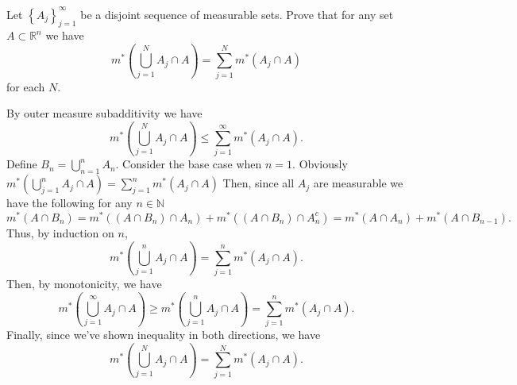 \begin{problem}{6}
  Let $\left\{ A_{j} \right\}_{j=1}^{\infty}$ be a disjoint sequence of measurable sets.
  Prove that for any set $A \subset \mathbb{R}^{n}$ we have 
  \[
  m^{*}\left( \bigcup_{j=1}^{N} A_{j} \cap A  \right) = \sum_{j=1}^{N} m^{*}\left( A_{j} \cap A \right)
  \] 
  for each $N$.
\end{problem}

\begin{solution}
  By outer measure subadditivity we have 
  \[
  m^{*}\left( \bigcup_{j=1}^{N}  A_{j} \cap A \right) \leq \sum_{j=1}^{\infty} m^{*}\left( A_{j} \cap A \right)
  .\] 
  Define $B_{n} = \bigcup_{n=1}^{n}A_{n} $.
  Consider the base case when $n = 1$.
  Obviously $m^{*}\left( \bigcup_{j=1}^{n} A_{j} \cap A  \right) = \sum_{j=1}^{n} m^{*}\left( A_{j} \cap A \right)$
  Then, since all $A_{j}$ are measurable we have the following for any $n \in \mathbb{N}$
  \[
  m^{*}(A \cap B_{n}) = m^{*}\left( \left( A \cap B_{n} \right) \cap A_{n} \right) + m^{*}\left( \left( A \cap B_{n} \right) \cap A_{n}^{c} \right) = m^{*}\left( A \cap A_{n} \right) + m^{*}\left( A \cap B_{n-1} \right)
  .\] 
  Thus, by induction on $n$, 
  \[
    m^{*}\left( \bigcup_{j=1}^{n}  A_{j} \cap A \right) = \sum_{j=1}^{n} m^{*}\left( A_{j} \cap A \right)
  .\] 
  Then, by monotonicity, we have 
  \[
  m^{*}\left( \bigcup_{j=1}^{\infty} A_{j} \cap A  \right) \geq m^{*}\left( \bigcup_{j=1}^{n} A_{j} \cap A  \right) = \sum_{j=1}^{n} m^{*}\left( A_{j} \cap A \right)
  .\] 
  Finally, since we've shown inequality in both directions, we have
  \[
    m^{*}\left( \bigcup_{j=1}^{N} A_{j} \cap A  \right) = \sum_{j=1}^{N} m^{*}\left( A_{j} \cap A \right)
  .\] 

  
\end{solution}
